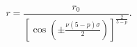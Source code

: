 \begin{equation}
r = \frac{r_0}{\left[\cos\left(\pm\frac{\nu(5-p)\sigma}{2}\right)
\right]^{\frac{2}{5-p}} }.
\label{cos}\end{equation}

